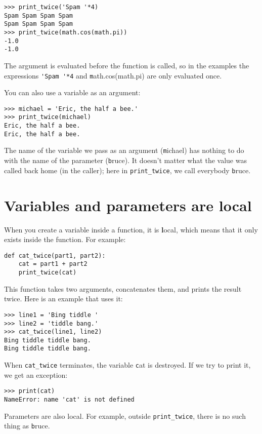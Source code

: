 \documentclass[
DIV=11,
fontsize=13,
twoside,
headinclude=false,
titlepage=firstiscover,
abstract=true,
headsepline=true,
footsepline=true,
chapterprefix=true, %
headings=big,
bibliography=totoc,%
captions=tableheading
]{scrbook}
\theoremstyle{definition}
\begin{document}
\begin{lstlisting}
>>> print_twice('Spam '*4)
Spam Spam Spam Spam
Spam Spam Spam Spam
>>> print_twice(math.cos(math.pi))
-1.0
-1.0
\end{lstlisting}
%
The argument is evaluated before the function is called, so
in the examples the expressions \verb"'Spam '*4" and
{\texttt math.cos(math.pi)} are only evaluated once.

You can also use a variable as an argument:

\begin{lstlisting}
>>> michael = 'Eric, the half a bee.'
>>> print_twice(michael)
Eric, the half a bee.
Eric, the half a bee.
\end{lstlisting}
%
The name of the variable we pass as an argument ({\texttt michael}) has
nothing to do with the name of the parameter ({\texttt bruce}).  It
doesn't matter what the value was called back home (in the caller);
here in \verb"print_twice", we call everybody {\texttt bruce}.


\section{Variables and parameters are local}

When you create a variable inside a function, it is {\textbf local},
which means that it only
exists inside the function.  For example:

\begin{lstlisting}
def cat_twice(part1, part2):
    cat = part1 + part2
    print_twice(cat)
\end{lstlisting}
%
This function takes two arguments, concatenates them, and prints
the result twice.  Here is an example that uses it:

\begin{lstlisting}
>>> line1 = 'Bing tiddle '
>>> line2 = 'tiddle bang.'
>>> cat_twice(line1, line2)
Bing tiddle tiddle bang.
Bing tiddle tiddle bang.
\end{lstlisting}
%
When \verb"cat_twice" terminates, the variable {\texttt cat}
is destroyed.  If we try to print it, we get an exception:

\begin{lstlisting}
>>> print(cat)
NameError: name 'cat' is not defined
\end{lstlisting}
%
Parameters are also local.
For example, outside \verb"print_twice", there is no
such thing as {\texttt bruce}.
\end{document}
